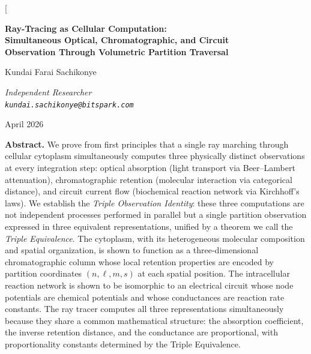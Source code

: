\documentclass[11pt,twocolumn,a4paper]{article}
\begin{document}
\twocolumn[
\begin{@twocolumnfalse}
\begin{center}

{\LARGE\bfseries Ray-Tracing as Cellular Computation:\\[4pt]
Simultaneous Optical, Chromatographic, and Circuit\\[4pt]
Observation Through Volumetric Partition Traversal}

\vspace{12pt}

{\large Kundai Farai Sachikonye}

\vspace{6pt}

{\small\itshape Independent Researcher \\[0.3em]
\texttt{kundai.sachikonye@bitspark.com}}

\vspace{6pt}

{\small April 2026}

\vspace{14pt}

\begin{minipage}{0.92\textwidth}
\textbf{Abstract.}
We prove from first principles that a single ray marching through
cellular cytoplasm simultaneously computes three physically distinct
observations at every integration step: optical absorption (light
transport via Beer--Lambert attenuation), chromatographic retention
(molecular interaction via categorical distance), and circuit current
flow (biochemical reaction network via Kirchhoff's laws). We establish
the \emph{Triple Observation Identity}: these three computations are
not independent processes performed in parallel but a single partition
observation expressed in three equivalent representations, unified by a
theorem we call the \emph{Triple Equivalence}. The cytoplasm, with its
heterogeneous molecular composition and spatial organization, is shown
to function as a three-dimensional chromatographic column whose local
retention properties are encoded by partition coordinates
$(n,\ell,m,s)$ at each spatial position. The intracellular reaction
network is shown to be isomorphic to an electrical circuit whose node
potentials are chemical potentials and whose conductances are reaction
rate constants. The ray tracer computes all three representations
simultaneously because they share a common mathematical structure: the
absorption coefficient, the inverse retention distance, and the
conductance are proportional, with proportionality constants determined
by the Triple Equivalence.


\end{minipage}
\end{center}
\end{@twocolumnfalse}
\end{document}
